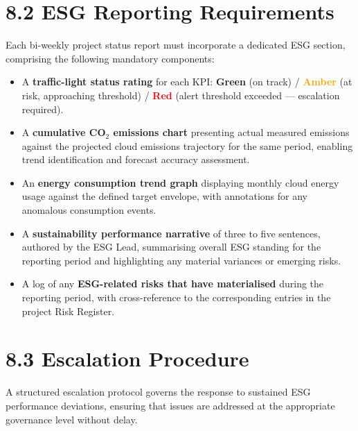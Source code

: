 \section{8.2 ESG Reporting Requirements}

Each bi-weekly project status report must incorporate a dedicated ESG
section, comprising the following mandatory components:

\begin{itemize}[label=\textcolor{midgreen}{$\bullet$}]

  \item A \textbf{traffic-light status rating} for each KPI:
    \textcolor{green!60!black}{\textbf{Green}} (on track) /
    \textcolor{orange}{\textbf{Amber}} (at risk, approaching threshold) /
    \textcolor{red}{\textbf{Red}} (alert threshold exceeded ---
    escalation required).

  \item A \textbf{cumulative CO$_2$ emissions chart} presenting actual
    measured emissions against the projected cloud emissions trajectory
    for the same period, enabling trend identification and forecast
    accuracy assessment.

  \item An \textbf{energy consumption trend graph} displaying monthly
    cloud energy usage against the defined target envelope, with
    annotations for any anomalous consumption events.

  \item A \textbf{sustainability performance narrative} of three to five
    sentences, authored by the ESG Lead, summarising overall ESG standing
    for the reporting period and highlighting any material variances or
    emerging risks.

  \item A log of any \textbf{ESG-related risks that have materialised}
    during the reporting period, with cross-reference to the corresponding
    entries in the project Risk Register.

\end{itemize}

\section{8.3 Escalation Procedure}

A structured escalation protocol governs the response to sustained ESG
performance deviations, ensuring that issues are addressed at the
appropriate governance level without delay.

